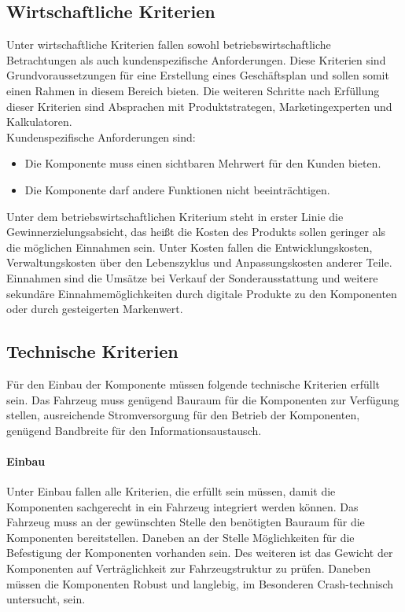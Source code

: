 \subsection{Wirtschaftliche Kriterien}
Unter wirtschaftliche Kriterien fallen sowohl betriebswirtschaftliche Betrachtungen als auch kundenspezifische Anforderungen. Diese Kriterien sind Grundvoraussetzungen für eine Erstellung eines Geschäftsplan und sollen somit einen Rahmen in diesem Bereich bieten. Die weiteren Schritte nach Erfüllung dieser Kriterien sind Absprachen mit Produktstrategen, Marketingexperten und Kalkulatoren. \\
Kundenspezifische Anforderungen sind:
\begin{itemize}
	\item Die Komponente muss einen sichtbaren Mehrwert für den Kunden bieten.
	\item Die Komponente darf andere Funktionen nicht beeinträchtigen.
\end{itemize}
Unter dem betriebswirtschaftlichen Kriterium steht in erster Linie die Gewinnerzielungsabsicht, das heißt die Kosten des Produkts sollen geringer als die möglichen Einnahmen sein. Unter Kosten fallen die Entwicklungskosten, Verwaltungskosten über den Lebenszyklus und Anpassungskosten anderer Teile.  \\
Einnahmen sind die Umsätze bei Verkauf der Sonderausstattung und weitere sekundäre Einnahmemöglichkeiten durch digitale Produkte zu den Komponenten oder durch gesteigerten Markenwert. 
\subsection{Technische Kriterien}
Für den Einbau der Komponente müssen folgende technische Kriterien erfüllt sein. Das Fahrzeug muss genügend Bauraum für die Komponenten zur Verfügung stellen, ausreichende Stromversorgung für den Betrieb der Komponenten, genügend Bandbreite für den Informationsaustausch.
\paragraph{Einbau}
Unter Einbau fallen alle Kriterien, die erfüllt sein müssen, damit die Komponenten sachgerecht in ein Fahrzeug integriert werden können.
Das Fahrzeug muss an der gewünschten Stelle den benötigten Bauraum für die Komponenten bereitstellen. Daneben an der Stelle Möglichkeiten für die Befestigung der Komponenten vorhanden sein. Des weiteren ist das Gewicht der Komponenten auf Verträglichkeit zur Fahrzeugstruktur zu prüfen. Daneben müssen die Komponenten Robust und langlebig, im Besonderen Crash-technisch untersucht, sein.

